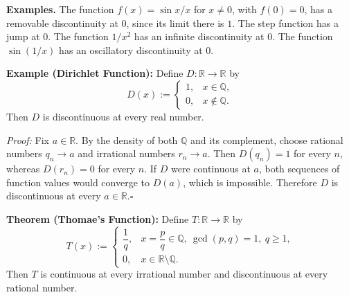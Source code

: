\documentclass[a4paper,11pt,abstracton]{scrartcl}
\newcommand{\RR}{\mathbb{R}}
\newcommand{\QQ}{\mathbb{Q}}
\theoremstyle{dotlessP}
\theoremstyle{dotlessS}
\theoremstyle{remark}
\theoremstyle{definition}
\begin{document}
\begin{example_box}
\textbf{Examples.} The function $f(x)=\sin x/x$ for $x\ne0$, with
$f(0)=0$, has a removable discontinuity at $0$, since its limit there
is $1$. The step function has a jump at $0$. The function $1/x^2$
has an infinite discontinuity at $0$. The function $\sin(1/x)$ has an
oscillatory discontinuity at $0$.
\end{example_box}

\begin{problem_box}
\textbf{Example (Dirichlet Function):} Define $D:\RR\to\RR$ by
\[
    D(x):=\begin{cases}
        1,&x\in\QQ,\\
        0,&x\notin\QQ.
    \end{cases}
\]
Then $D$ is discontinuous at every real number.
\end{problem_box}

\begin{claim_box}
\textit{Proof:} Fix $a\in\RR$. By the density of both $\QQ$ and its
complement, choose rational numbers $q_n\to a$ and irrational numbers
$r_n\to a$. Then $D(q_n)=1$ for every $n$, whereas $D(r_n)=0$ for
every $n$. If $D$ were continuous at $a$, both sequences of function
values would converge to $D(a)$, which is impossible. Therefore $D$
is discontinuous at every $a\in\RR$.\hfill$\square$
\end{claim_box}

\begin{problem_box}
\textbf{Theorem (Thomae's Function):}
Define $T:\RR\to\RR$ by
\[
    T(x):=\begin{cases}
        \dfrac1q, & x=\dfrac pq\in\QQ,\ \gcd(p,q)=1,\ q\ge1,\\[2mm]
        0, & x\in\RR\setminus\QQ.
    \end{cases}
\]
Then $T$ is continuous at every irrational number and discontinuous at every rational number.
\end{problem_box}
\end{document}

